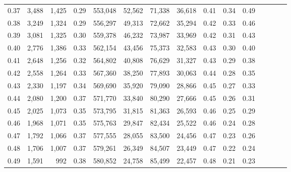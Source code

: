 \begin{tabular}{rrrcrrrrrrrrrrr}
0.37 &   3,488 &  1,425 &                                       0.29 &  553,048 &   52,562 &   71,338 &   36,618 &  0.41 &  0.34 &                         0.49 \\
0.38 &   3,249 &  1,324 &                                       0.29 &  556,297 &   49,313 &   72,662 &   35,294 &  0.42 &  0.33 &                         0.46 \\
0.39 &   3,081 &  1,325 &                                       0.30 &  559,378 &   46,232 &   73,987 &   33,969 &  0.42 &  0.31 &                         0.43 \\
0.40 &   2,776 &  1,386 &                                       0.33 &  562,154 &   43,456 &   75,373 &   32,583 &  0.43 &  0.30 &                         0.40 \\
0.41 &   2,648 &  1,256 &                                       0.32 &  564,802 &   40,808 &   76,629 &   31,327 &  0.43 &  0.29 &                         0.38 \\
0.42 &   2,558 &  1,264 &                                       0.33 &  567,360 &   38,250 &   77,893 &   30,063 &  0.44 &  0.28 &                         0.35 \\
0.43 &   2,330 &  1,197 &                                       0.34 &  569,690 &   35,920 &   79,090 &   28,866 &  0.45 &  0.27 &                         0.33 \\
0.44 &   2,080 &  1,200 &                                       0.37 &  571,770 &   33,840 &   80,290 &   27,666 &  0.45 &  0.26 &                         0.31 \\
0.45 &   2,025 &  1,073 &                                       0.35 &  573,795 &   31,815 &   81,363 &   26,593 &  0.46 &  0.25 &                         0.29 \\
0.46 &   1,968 &  1,071 &                                       0.35 &  575,763 &   29,847 &   82,434 &   25,522 &  0.46 &  0.24 &                         0.28 \\
0.47 &   1,792 &  1,066 &                                       0.37 &  577,555 &   28,055 &   83,500 &   24,456 &  0.47 &  0.23 &                         0.26 \\
0.48 &   1,706 &  1,007 &                                       0.37 &  579,261 &   26,349 &   84,507 &   23,449 &  0.47 &  0.22 &                         0.24 \\
0.49 &   1,591 &    992 &                                       0.38 &  580,852 &   24,758 &   85,499 &   22,457 &  0.48 &  0.21 &                         0.23 \\

\end{tabular}
